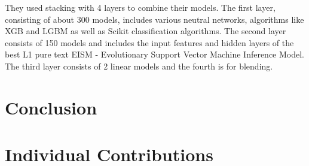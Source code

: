\documentclass{article}
\begin{document}
They used stacking with 4 layers to combine their models. The first layer,
consisting of about 300 models, includes various neutral networks, algorithms
like XGB and LGBM as well as Scikit classification algorithms. The second layer
consists of 150 models and includes the input features and hidden layers of the
best L1 pure text EISM - Evolutionary Support Vector Machine Inference Model.
The third layer consists of 2 linear models and the fourth is for blending.

\section{Conclusion}

\appendix
\section*{Individual Contributions}
\end{document}
